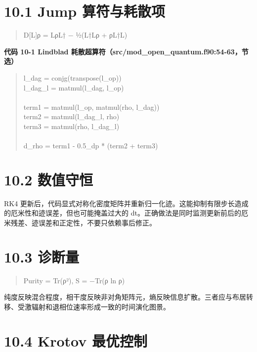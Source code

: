 \documentclass[UTF8,openany,11pt,fontset=fandol]{ctexbook}
\begin{document}
\section{\texorpdfstring{\textbf{10.1 Jump
算符与耗散项}}{10.1 Jump 算符与耗散项}}\label{jump-ux7b97ux7b26ux4e0eux8017ux6563ux9879}

\begin{quote}
D{[}L{]}ρ = LρL† − ½(L†Lρ + ρL†L)
\end{quote}

\textbf{代码 10-1 Lindblad
耗散超算符（src/mod\_open\_quantum.f90:54-63，节选）}

\begin{quote}
l\_dag = conjg(transpose(l\_op))\\
l\_dag\_l = matmul(l\_dag, l\_op)\\
~\\
term1 = matmul(l\_op, matmul(rho, l\_dag))\\
term2 = matmul(l\_dag\_l, rho)\\
term3 = matmul(rho, l\_dag\_l)\\
~\\
d\_rho = term1 - 0.5\_dp * (term2 + term3)
\end{quote}

\section{\texorpdfstring{\textbf{10.2
数值守恒}}{10.2 数值守恒}}\label{ux6570ux503cux5b88ux6052}

RK4
更新后，代码显式对称化密度矩阵并重新归一化迹。这能抑制有限步长造成的厄米性和迹误差，但也可能掩盖过大的
dt。正确做法是同时监测更新前后的厄米残差、迹误差和正定性，不要只依赖事后修正。

\section{\texorpdfstring{\textbf{10.3
诊断量}}{10.3 诊断量}}\label{ux8bcaux65adux91cf}

\begin{quote}
Purity = Tr(ρ²), S = −Tr(ρ ln ρ)
\end{quote}

纯度反映混合程度，相干度反映非对角矩阵元，熵反映信息扩散。三者应与布居转移、受激辐射和退相位速率形成一致的时间演化图景。

\section{\texorpdfstring{\textbf{10.4 Krotov
最优控制}}{10.4 Krotov 最优控制}}\label{krotov-ux6700ux4f18ux63a7ux5236}
\end{document}

